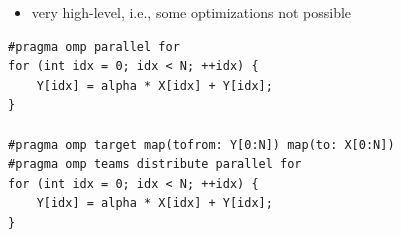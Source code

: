 \begin{disadvantagebox}
    \begin{itemize}
        \item very high-level, i.e., some optimizations not possible
    \end{itemize}
\end{disadvantagebox}


\begin{listing}
    \begin{verbatim}
#pragma omp parallel for
for (int idx = 0; idx < N; ++idx) {
    Y[idx] = alpha * X[idx] + Y[idx];
}

#pragma omp target map(tofrom: Y[0:N]) map(to: X[0:N])
#pragma omp teams distribute parallel for
for (int idx = 0; idx < N; ++idx) {
    Y[idx] = alpha * X[idx] + Y[idx];
}
    \end{verbatim}
    \caption{%
    SAXPY example using \gls{openmp}.
}
\end{listing}
